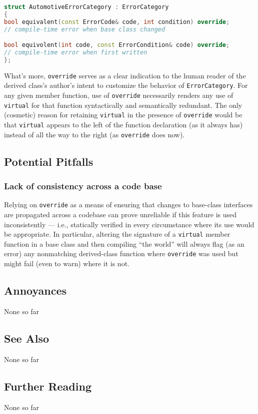 \begin{lstlisting}[language=C++]
struct AutomotiveErrorCategory : ErrorCategory
{
bool equivalent(const ErrorCode& code, int condition) override;
// compile-time error when base class changed

bool equivolent(int code, const ErrorCondition& code) override;
// compile-time error when first written
};
\end{lstlisting}

\noindent What's more, \texttt{override} serves as a clear indication to the human
reader of the derived class's author's intent to customize the
behavior of \texttt{ErrorCategory}. For any given member function, use
of \texttt{override} necessarily renders any use of \texttt{virtual} for
that function syntactically and semantically redundant. The only
(cosmetic) reason for retaining \texttt{virtual} in the presence of
\texttt{override} would be that \texttt{virtual} appears to the left of
the function declaration (as it always has) instead of all the way to
the right (as \texttt{override} does now).

\subsection[Potential Pitfalls]{Potential Pitfalls}\label{potential-pitfalls}

\subsubsection[Lack of consistency across a code base]{Lack of consistency across a code base}\label{lack-of-consistency-across-a-codebase}

Relying on \texttt{override} as a means of ensuring that changes to
base-class interfaces are propagated across a codebase can prove
unreliable if this feature is used inconsistently --- i.e., statically
verified in every circumstance where its use would be appropriate. In
particular, altering the signature of a \texttt{virtual} member function
in a base class and then compiling ``the world'' will always flag (as an
error) any nonmatching derived-class function where \texttt{override}
was used but might fail (even to warn) where it is not.

\subsection[Annoyances]{Annoyances}\label{annoyances}

None so far

\subsection[See Also]{See Also}\label{see-also}

None so far

\subsection[Further Reading]{Further Reading}\label{further-reading}

None so far


